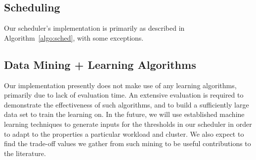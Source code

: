 \subsection{Scheduling}


Our scheduler's implementation is primarily as described in
Algorithm~\ref{algo:sched}, with some exceptions.

\subsection{Data Mining + Learning Algorithms}

Our implementation presently does not make use of any learning algorithms,
primarily due to lack of evaluation time.  An extensive evaluation is required
to demonstrate the effectiveness of such algorithms, and to build a sufficiently
large data set to train the learning on.  In the future, we will use established
machine learning techniques to generate inputs for the thresholds in our
scheduler in order to adapt to the properties a particular workload and cluster.
We also expect to find the trade-off values we gather from such mining to be
useful contributions to the literature.

%
%

